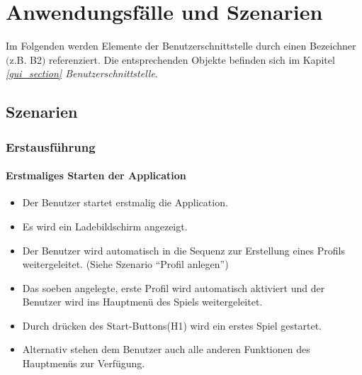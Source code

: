 \section{Anwendungsfälle und Szenarien}

Im Folgenden werden Elemente der Benutzerschnittstelle durch einen Bezeichner $($z.B. B2$)$ referenziert. Die entsprechenden Objekte befinden sich im Kapitel \textit{\ref{gui_section} Benutzerschnittstelle}.

\subsection{Szenarien}

\subsubsection{Erstausführung}
\paragraph{Erstmaliges Starten der Application}
\begin{itemize}
	\item Der Benutzer startet erstmalig die Application.
	\item Es wird ein Ladebildschirm angezeigt.
	\item Der Benutzer wird automatisch in die Sequenz zur Erstellung eines Profils weitergeleitet. (Siehe Szenario "`Profil anlegen"')
	\item Das soeben angelegte, erste Profil wird automatisch aktiviert und der Benutzer wird ins Hauptmenü des Spiels weitergeleitet.
	\item Durch drücken des Start-Buttons(H1) wird ein erstes Spiel gestartet.
	\item Alternativ stehen dem Benutzer auch alle anderen Funktionen des Hauptmenüs zur Verfügung.
\end{itemize}
